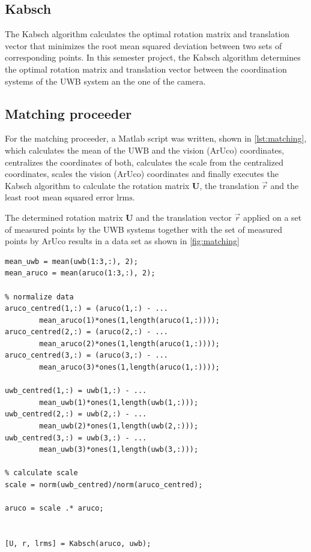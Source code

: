 \subsection{Kabsch}
The Kabsch algorithm \cite{Kabsch:a12999} calculates the optimal rotation matrix and translation vector that minimizes the root mean squared deviation between two sets of corresponding points. In this semester project, the Kabsch algorithm determines the optimal rotation matrix and translation vector between the coordination systems of the UWB system an the one of the camera.

\subsection{Matching proceeder}\label{subsec:matching}
For the matching proceeder, a Matlab script was written, shown in \autoref{lst:matching}, which calculates the mean of the UWB and the vision (ArUco) coordinates, centralizes the coordinates of both, calculates the scale from the centralized coordinates, scales the vision (ArUco) coordinates and finally executes the Kabsch algorithm to calculate the rotation matrix $\textbf{U}$, the translation $\vec r$ and the least root mean squared error $\text{lrms}$.

The determined rotation matrix $\textbf{U}$ and the translation vector $\vec r$ applied on a set of measured points by the UWB systems together with the set of measured points by ArUco results in a data set as shown in \autoref{fig:matching}

\lstset{language=Matlab}
\begin{lstlisting}[frame=single, caption=Matching proceeder, label=lst:matching]
% Calculate mean
mean_uwb = mean(uwb(1:3,:), 2);
mean_aruco = mean(aruco(1:3,:), 2);
	
% normalize data	
aruco_centred(1,:) = (aruco(1,:) - ...
		mean_aruco(1)*ones(1,length(aruco(1,:))));
aruco_centred(2,:) = (aruco(2,:) - ...
		mean_aruco(2)*ones(1,length(aruco(1,:))));
aruco_centred(3,:) = (aruco(3,:) - ...
		mean_aruco(3)*ones(1,length(aruco(1,:))));

uwb_centred(1,:) = uwb(1,:) - ...
		mean_uwb(1)*ones(1,length(uwb(1,:)));
uwb_centred(2,:) = uwb(2,:) - ...
		mean_uwb(2)*ones(1,length(uwb(2,:)));
uwb_centred(3,:) = uwb(3,:) - ...
		mean_uwb(3)*ones(1,length(uwb(3,:)));
	
% calculate scale
scale = norm(uwb_centred)/norm(aruco_centred);
	
aruco = scale .* aruco;
	
	
[U, r, lrms] = Kabsch(aruco, uwb);
\end{lstlisting}

